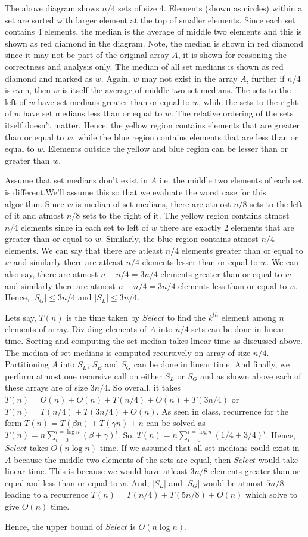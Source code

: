 \documentclass{article}
\begin{document}
    The above diagram shows $n/4$ sets of size 4. Elements (shown as circles) within a set are sorted with larger element at the top of smaller elements. Since each set contains 4 elements, the median is the average of middle two elements and this is shown as red diamond in the diagram. Note, the median is shown in red diamond since it may not be part of the original array $A$, it is shown for reasoning the correctness and analysis only. The median of all set medians is shown as red diamond and marked as $w$. Again, $w$ may not exist in the array $A$, further if $n/4$ is even, then $w$ is itself the average of middle two set medians. The sets to the left of $w$ have set medians greater than or equal to $w$, while the sets to the right of $w$ have set medians less than or equal to $w$. The relative ordering of the sets itself doesn't matter. Hence, the yellow region contains elements that are greater than or equal to $w$, while the blue region contains elements that are less than or equal to $w$. Elements outside the yellow and blue region can be lesser than or greater than $w$.
    
    Assume that set medians don't exist in $A$ i.e. the middle two elements of each set is different.We'll assume this so that we evaluate the worst case for this algorithm. Since $w$ is median of set medians, there are atmost $n/8$ sets to the left of it and atmost $n/8$ sets to the right of it. The yellow region contains atmost $n/4$ elements since in each set to left of $w$ there are exactly 2 elements that are greater than or equal to $w$. Similarly, the blue region contains atmost $n/4$ elements. We can say that there are atleast $n/4$ elements greater than or equal to $w$ and similarly there are atleast $n/4$ elements lesser than or equal to $w$. We can also say, there are atmost $n-n/4 = 3n/4$ elements greater than or equal to $w$ and similarly there are atmost $n-n/4 = 3n/4$ elements less than or equal to $w$. Hence, $|S_G| \le 3n/4$ and $|S_L| \le 3n/4$.

    Lets say, $T(n)$ is the time taken by $Select$ to find the $k^{th}$ element among $n$ elements of array. Dividing elements of $A$ into $n/4$ sets can be done in linear time. Sorting and computing the set median takes linear time as discussed above. The median of set medians is computed recursively on array of size $n/4$. Partitioning $A$ into $S_L$, $S_E$ and $S_G$ can be done in linear time. And finally, we perform atmost one recursive call on either $S_L$ or $S_G$ and as shown above each of these arrays are of size $3n/4$. So overall, it takes $T(n) = O(n) + O(n) + T(n/4) + O(n) + T(3n/4)$ or $T(n) = T(n/4) + T(3n/4) + O(n)$. As seen in class, recurrence for the form $T(n) = T(\beta n) + T(\gamma n) + n$ can be solved as $T(n) = n \sum_{i=0}^{i=\log n} (\beta + \gamma)^i$. So, $T(n) = n \sum_{i=0}^{i=\log n} (1/4 + 3/4)^i$. Hence, $Select$ takes $O(n \log n)$ time. If we assumed that all set medians could exist in $A$ because the middle two elements of the sets are equal, then $Select$ would take linear time. This is because we would have atleast $3n/8$ elements greater than or equal and less than or equal to $w$. And, $|S_L|$ and $|S_G|$ would be atmost $5n/8$ leading to a recurrence $T(n) = T(n/4) + T(5n/8) + O(n)$ which solve to give $O(n)$ time.

    Hence, the upper bound of $Select$ is $O(n \log n)$.
\end{document}

